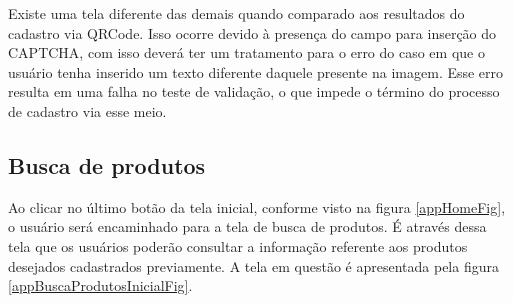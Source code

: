 Existe uma tela diferente das demais quando comparado aos resultados do cadastro via QRCode. Isso ocorre devido à presença do campo para inserção do CAPTCHA, com isso deverá ter um tratamento para o erro do caso em que o usuário tenha inserido um texto diferente daquele presente na imagem. Esse erro resulta em uma falha no teste de validação, o que impede o término do processo de cadastro via esse meio.

\subsection{Busca de produtos}

Ao clicar no último botão da tela inicial, conforme visto na figura \ref{appHomeFig}, o usuário será encaminhado para a tela de busca de produtos. É através dessa tela que os usuários poderão consultar a informação referente aos produtos desejados cadastrados previamente. A tela em questão é apresentada pela figura \ref{appBuscaProdutosInicialFig}.

